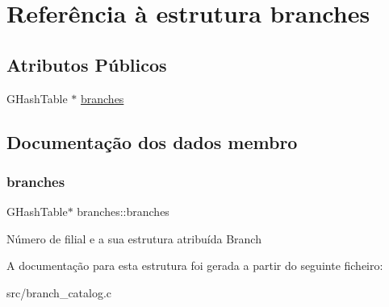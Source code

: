 \hypertarget{structbranches}{}\section{Referência à estrutura branches}
\label{structbranches}
\subsection*{Atributos Públicos}
\begin{DoxyCompactItemize}
\item 
G\+Hash\+Table $\ast$ \hyperlink{structbranches_acdb4f47424b5b3b682b312a8804d6ee5}{branches}
\end{DoxyCompactItemize}


\subsection{Documentação dos dados membro}
\mbox{\label{structbranches_acdb4f47424b5b3b682b312a8804d6ee5}} 
\subsubsection{\texorpdfstring{branches}{branches}}
{\footnotesize\ttfamily G\+Hash\+Table$\ast$ branches\+::branches}

Número de filial e a sua estrutura atribuída Branch 

A documentação para esta estrutura foi gerada a partir do seguinte ficheiro\+:\begin{DoxyCompactItemize}
\item 
src/branch\+\_\+catalog.\+c\end{DoxyCompactItemize}
